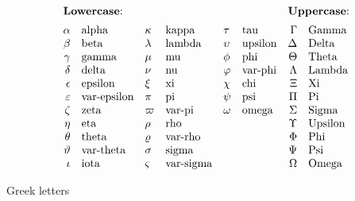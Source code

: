 \begin{table}%

$$
\begin{array}{r*5lrl}
\multicolumn{6}{l}{\text{\textbf{Lowercase}:}} &\multicolumn{2}{l}{\text{\textbf{Uppercase}:}}\\[.5em]
\alpha		& \text{alpha}			& \kappa	& \text{kappa}			& \tau		& \text{tau}		& \Gamma		& \text{Gamma} \\
\beta		& \text{beta}			& \lambda	& \text{lambda}			& \upsilon	& \text{upsilon}	& \Delta		& \text{Delta} \\
\gamma		& \text{gamma}			& \mu		& \text{mu}				& \phi		& \text{phi}		& \Theta		& \text{Theta} \\
\delta		& \text{delta}			& \nu		& \text{nu}				& \varphi	& \text{var-phi}	& \Lambda		& \text{Lambda} \\
\epsilon	& \text{epsilon}  		& \xi		& \text{xi}				& \chi		& \text{chi}		& \Xi			& \text{Xi} \\
\varepsilon	& \text{var-epsilon}	& \pi		& \text{pi}				& \psi		& \text{psi} 		& \Pi			& \text{Pi} \\
\zeta		& \text{zeta}			& \varpi	& \text{var-pi}			& \omega	& \text{omega}		& \Sigma		& \text{Sigma} \\
\eta		& \text{eta}			& \rho		& \text{rho}			&			&					& \Upsilon		& \text{Upsilon} \\
\theta		& \text{theta}			& \varrho	& \text{var-rho}		&			&					& \Phi			& \text{Phi} \\
\vartheta	& \text{var-theta}		& \sigma	& \text{sigma}			&			&					& \Psi			& \text{Psi} \\
\iota		& \text{iota} 			& \varsigma	& \text{var-sigma}		&			&					& \Omega		& \text{Omega}
\end{array}
$$
  
  \caption{Greek letters}\label{tbl:greek}
\end{table}